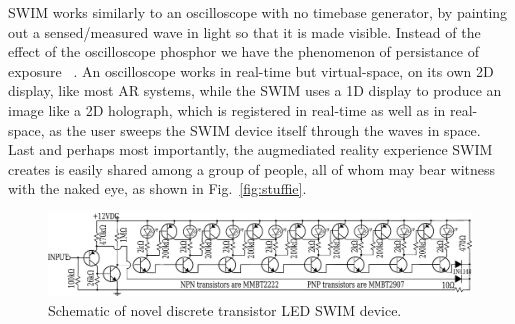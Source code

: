 \documentclass{sigchi-ext}
\begin{document}
SWIM works similarly to an oscilloscope with no timebase generator, by painting out a sensed/measured wave in light so that it is made visible. Instead of the effect of the oscilloscope phosphor we have the phenomenon of persistance of exposure ~\cite{mann2015phenomenal}. An oscilloscope works in real-time but virtual-space, on its own 2D display, like most AR systems, while the SWIM uses a 1D display to produce an image like a 2D holograph, which is registered in real-time as well as in real-space, as the user sweeps the SWIM device itself through the waves in space. 
Last and perhaps most importantly, the augmediated reality experience SWIM
creates is easily shared among a group of people, all of whom may bear witness
with the naked eye, as shown in Fig.~\ref{fig:stuffie}.
\begin{figure}
 \centering
 \includegraphics[width=.5\textwidth]{schematic.pdf}
 \caption{Schematic of  novel discrete transistor LED SWIM device.}
 \label{fig:schematictransistors}
\end{figure}
\end{document}
